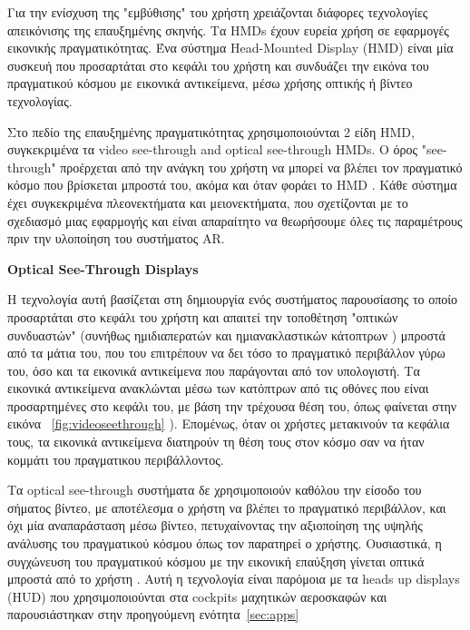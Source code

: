 Για την ενίσχυση της "εμβύθισης" του χρήστη χρειάζονται διάφορες τεχνολογίες απεικόνισης της επαυξημένης σκηνής. Τα HMDs έχουν ευρεία χρήση σε εφαρμογές εικονικής πραγματικότητας. Ένα σύστημα Head-Mounted Display (HMD) είναι μία συσκευή που προσαρτάται στο κεφάλι του χρήστη και συνδυάζει την εικόνα του πραγματικού κόσμου με εικονικά αντικείμενα, μέσω χρήσης οπτικής ή βίντεο τεχνολογίας. 


Στο πεδίο της επαυξημένης πραγματικότητας χρησιμοποιούνται 2 είδη HMD, συγκεκριμένα τα video see-through and optical see-through HMDs. Ο όρος "see-through" προέρχεται από την ανάγκη του χρήστη να μπορεί να βλέπει τον πραγματικό κόσμο που βρίσκεται μπροστά του, ακόμα και όταν φοράει το HMD \cite{barfield2001fundamentals}. Κάθε σύστημα έχει συγκεκριμένα πλεονεκτήματα και μειονεκτήματα, που σχετίζονται με το σχεδιασμό μιας εφαρμογής και είναι απαραίτητο  να θεωρήσουμε όλες τις παραμέτρους πριν την υλοποίηση του συστήματος AR. 




 
\textbf{Optical See-Through Displays}


Η τεχνολογία αυτή βασίζεται στη δημιουργία ενός συστήματος παρουσίασης το οποίο προσαρτάται στο κεφάλι του χρήστη και απαιτεί την τοποθέτηση "οπτικών συνδυαστών" (συνήθως ημιδιαπερατών και ημιανακλαστικών κάτοπτρων ) μπροστά από τα μάτια του, που του επιτρέπουν να δει τόσο το πραγματικό περιβάλλον γύρω του, όσο και τα εικονικά αντικείμενα που παράγονται από τον υπολογιστή. 
Τα εικονικά αντικείμενα ανακλώνται μέσω των κατόπτρων από τις οθόνες που είναι προσαρτημένες στο κεφάλι του, με βάση την τρέχουσα θέση του, όπως φαίνεται στην εικόνα ~\ref{fig:videoseethrough} ).  Επομένως, όταν οι χρήστες μετακινούν τα κεφάλια τους, τα εικονικά αντικείμενα διατηρούν τη θέση τους στον κόσμο σαν να ήταν κομμάτι του πραγματικου περιβάλλοντος.



Τα optical see-through συστήματα δε χρησιμοποιούν καθόλου την είσοδο του σήματος βίντεο, με αποτέλεσμα ο χρήστη να βλέπει το πραγματικό περιβάλλον, και όχι μία αναπαράσταση μέσω βίντεο, πετυχαίνοντας την αξιοποίηση της υψηλής ανάλυσης του πραγματικού κόσμου όπως τον παρατηρεί ο χρήστης. Ουσιαστικά, η συγχώνευση του πραγματικού κόσμου με την εικονική επαύξηση γίνεται οπτικά μπροστά από το χρήστη \cite{Vallino1998} . Αυτή η τεχνολογία είναι παρόμοια με τα  heads up displays (HUD) που χρησιμοποιούνται στα cockpits μαχητικών αεροσκαφών και παρουσιάστηκαν στην προηγούμενη ενότητα~\ref{sec:apps}


